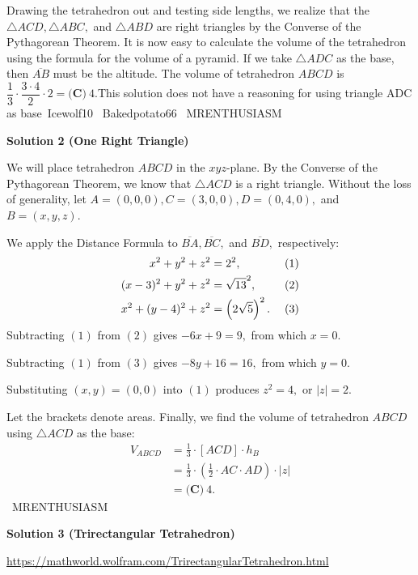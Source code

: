 \begin{enumerate}
Drawing the tetrahedron out and testing side lengths, we realize that the $\triangle ACD, \triangle ABC,$ and $\triangle ABD$ are right triangles by the Converse of the Pythagorean Theorem. It is now easy to calculate the volume of the tetrahedron using the formula for the volume of a pyramid. If we take $\triangle ADC$ as the base, then $\overline{AB}$ must be the altitude. The volume of tetrahedron $ABCD$ is $\dfrac{1}{3} \cdot \dfrac{3 \cdot 4}{2} \cdot 2=\boxed{\textbf{(C)} ~4}.$This solution does not have a reasoning for using triangle ADC as base~Icewolf10 ~Bakedpotato66 ~MRENTHUSIASM

 



\textbf{Solution 2 (One Right Triangle)}

We will place tetrahedron $ABCD$ in the $xyz$-plane. By the Converse of the Pythagorean Theorem, we know that $\triangle ACD$ is a right triangle. Without the loss of generality, let $A=(0,0,0), C=(3,0,0), D=(0,4,0),$ and $B=(x,y,z).$

 We apply the Distance Formula to $\overline{BA},\overline{BC},$ and $\overline{BD},$ respectively:
 \begin{align*} x^2+y^2+z^2&=2^2, &(1) \\ (x-3)^2+y^2+z^2&=\sqrt{13}^2, &(2) \\ x^2+(y-4)^2+z^2&=\left(2\sqrt5\right)^2. &\hspace{1mm} (3) \end{align*}
Subtracting $(1)$ from $(2)$ gives $-6x+9=9,$ from which $x=0.$

 Subtracting $(1)$ from $(3)$ gives $-8y+16=16,$ from which $y=0.$

 Substituting $(x,y)=(0,0)$ into $(1)$ produces $z^2=4,$ or $|z|=2.$

 Let the brackets denote areas. Finally, we find the volume of tetrahedron $ABCD$ using $\triangle ACD$ as the base:
 \begin{align*} V_{ABCD}&=\frac13\cdot[ACD]\cdot h_B \\ &=\frac13\cdot\left(\frac12\cdot AC \cdot AD\right)\cdot |z| \\ &=\boxed{\textbf{(C)} ~4}. \end{align*}
~MRENTHUSIASM

 



\textbf{Solution 3 (Trirectangular Tetrahedron)}

\href{https://mathworld.wolfram.com/TrirectangularTetrahedron.html}{https://mathworld.wolfram.com/TrirectangularTetrahedron.html}


\end{enumerate}
